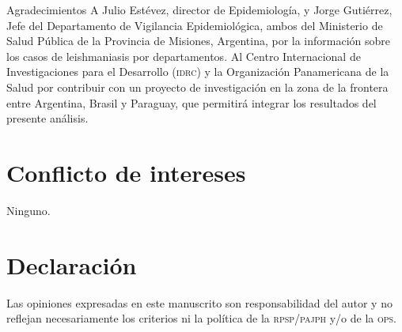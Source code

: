 \documentclass{article}
\begin{document}
Agradecimientos
A Julio Estévez, director de Epidemiología, y Jorge Gutiérrez, Jefe del
Departamento de Vigilancia Epidemiológica, ambos del Ministerio de Salud Pública
de la Provincia de Misiones, Argentina, por la información sobre los casos de
leishmaniasis por departamentos. Al Centro Internacional de Investigaciones para
el Desarrollo (\textsc{idrc}) y la Organización Panamericana de la Salud por contribuir
con un proyecto de investigación en la zona de la frontera entre Argentina,
Brasil y Paraguay, que permitirá integrar los resultados del presente análisis.
\section{Conflicto de intereses}

Ninguno.

\section{Declaración}

Las opiniones expresadas en este manuscrito son responsabilidad del autor y no
reflejan necesariamente los criterios ni la política de la \textsc{rpsp}/\textsc{pajph} y/o de la
\textsc{ops}.
\end{document}
